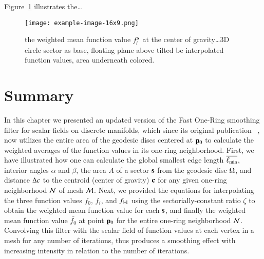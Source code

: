 Figure~\ref{fig:weightedMean} illustrates the\dots
\begin{figure}[ht]
\ffigbox
	{\texttt{[image: example-image-16x9.png]}}
	{\caption[Weighted Mean function value $f^\bs_i$ at the center of gravity]{the weighted mean function value $f^\bs_i$ at the center of gravity\ldots 3D circle sector as base, floating plane above tilted be interpolated function values, area underneath colored.}\label{fig:weightedMean}}
\end{figure}
%
\section{Summary}
\label{ch4sS}
In this chapter we presented an updated version of the Fast One-Ring smoothing filter for scalar fields on discrete manifolds, which since its original publication ~\cite[s.~3.2]{Mara17}, now utilizes the entire area of the geodesic discs centered at $\mathbf{p}_0$ to calculate the weighted averages of the function values in its one-ring neighborhood. First, we have illustrated how one can calculate the global smallest edge length $\overline{\ell_\text{min}}$, interior angles $\alpha$ and $\beta$, the area $A$ of a sector $\mathbf{s}$ from the geodesic disc $\Omega$, and distance $\Delta c$ to the centroid (center of gravity) $\mathbf{c}$ for any given one-ring neighborhood $\mathcal{N}$ of mesh $\mathcal{M}$. Next, we provided the equations for interpolating the three function values $f_0$, $f_i$, and $f_{\sipo}$ using the sectorially-constant ratio $\zeta$ to obtain the weighted mean function value for each $\mathbf{s}$, and finally the weighted mean function value $\bar{f_0}$ at point ${\mathbf{p}_0}$ for the entire one-ring neighborhood $\mathcal{N}$. Convolving this filter with the scalar field of function values at each vertex in a mesh for any number of iterations, thus produces a smoothing effect with increasing intensity in relation to the number of iterations.
